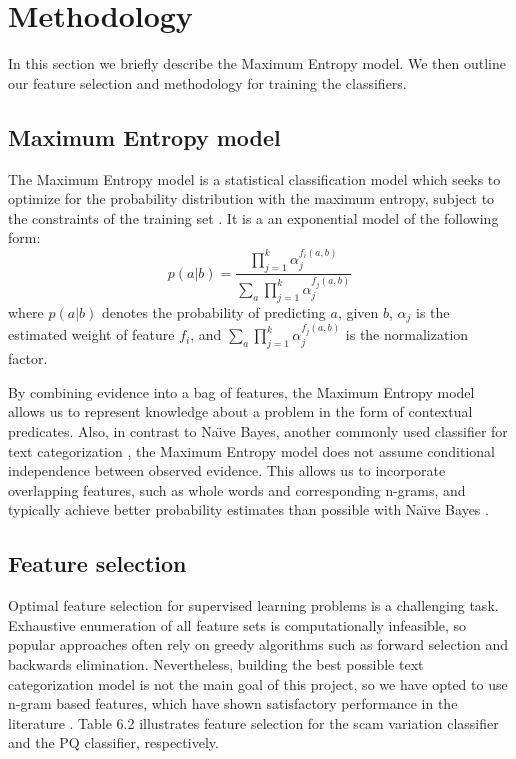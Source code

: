 \section{Methodology}
In this section we briefly describe the Maximum Entropy model. We then outline our feature selection and methodology for training the classifiers.

\subsection{Maximum Entropy model}
The Maximum Entropy model is a statistical classification model which seeks to optimize for the probability distribution with the maximum entropy, subject to the constraints of the training set . It is a an exponential model of the following form:
\begin{equation}
	p(a|b) = \frac{\prod_{j=1}^{k} \alpha_j^{f_i(a,b)}}{\sum_{a} \prod_{j=1}^{k} \alpha_j^{f_j(a,b)}}
\end{equation}
where $p(a|b)$ denotes the probability of predicting $a$, given $b$, $\alpha_{j}$ is the estimated weight of feature $f_{i}$, and $\sum_{a} \prod_{j=1}^{k} \alpha_j^{f_j(a,b)}$ is the normalization factor. 

By combining evidence into a bag of features, the Maximum Entropy model allows us to represent knowledge about a problem in the form of contextual predicates. Also, in contrast to Na\"{\i}ve Bayes, another commonly used classifier for text categorization \cite{P18}, the Maximum Entropy model does not assume conditional independence between observed evidence. This allows us to incorporate overlapping features, such as whole words and corresponding n-grams, and typically achieve better probability estimates than possible with Na\"{\i}ve Bayes \cite{P19}.

\subsection{Feature selection}
Optimal feature selection for supervised learning problems is a challenging task. Exhaustive enumeration of all feature sets is computationally infeasible, so popular approaches often rely on greedy algorithms such as forward selection and backwards elimination. Nevertheless, building the best possible text categorization model is not the main goal of this project, so we have opted to use n-gram based features, which have shown satisfactory performance in the literature \cite{P20}. Table 6.2 illustrates feature selection for the scam variation classifier and the PQ classifier, respectively.

